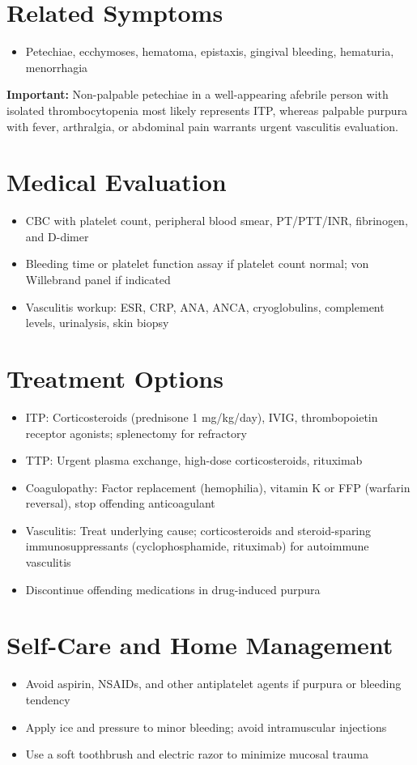 \section*{Related Symptoms}
\begin{itemize}
  \item Petechiae, ecchymoses, hematoma, epistaxis, gingival bleeding, hematuria, menorrhagia
\end{itemize}
\textbf{Important:} Non-palpable petechiae in a well-appearing afebrile person with isolated thrombocytopenia most likely represents ITP, whereas palpable purpura with fever, arthralgia, or abdominal pain warrants urgent vasculitis evaluation.

\section*{Medical Evaluation}
\begin{itemize}
  \item CBC with platelet count, peripheral blood smear, PT/PTT/INR, fibrinogen, and D-dimer
  \item Bleeding time or platelet function assay if platelet count normal; von Willebrand panel if indicated
  \item Vasculitis workup: ESR, CRP, ANA, ANCA, cryoglobulins, complement levels, urinalysis, skin biopsy
\end{itemize}

\section*{Treatment Options}
\begin{itemize}
  \item ITP: Corticosteroids (prednisone 1 mg/kg/day), IVIG, thrombopoietin receptor agonists; splenectomy for refractory
  \item TTP: Urgent plasma exchange, high-dose corticosteroids, rituximab
  \item Coagulopathy: Factor replacement (hemophilia), vitamin K or FFP (warfarin reversal), stop offending anticoagulant
  \item Vasculitis: Treat underlying cause; corticosteroids and steroid-sparing immunosuppressants (cyclophosphamide, rituximab) for autoimmune vasculitis
  \item Discontinue offending medications in drug-induced purpura
\end{itemize}

\section*{Self-Care and Home Management}
\begin{itemize}
  \item Avoid aspirin, NSAIDs, and other antiplatelet agents if purpura or bleeding tendency
  \item Apply ice and pressure to minor bleeding; avoid intramuscular injections
  \item Use a soft toothbrush and electric razor to minimize mucosal trauma
\end{itemize}

